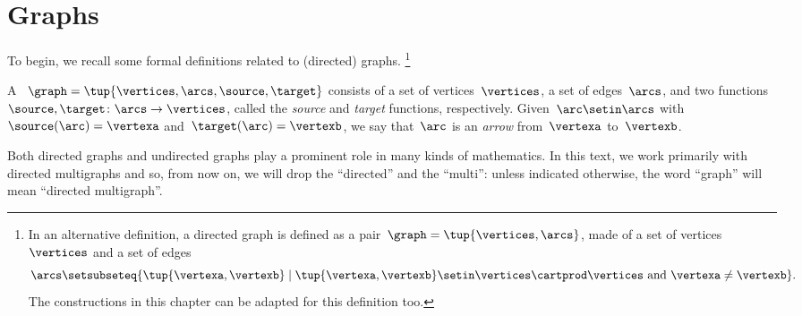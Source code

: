 
\section{Graphs}


To begin, we recall some formal definitions related to (directed) graphs.
\footnote{
    In an alternative definition, a directed graph is defined as a pair~$\graph=\tup{\vertices, \arcs}$, made of a set of vertices~$\vertices$ and a set of edges
    \begin{equation*}
        \arcs \setsubseteq \{ \tup{\vertexa, \vertexb} \mid \tup{\vertexa, \vertexb} \setin \vertices \cartprod \vertices \text{ and } \vertexa \neq \vertexb\}.
    \end{equation*}
    The constructions in this chapter can be adapted for this definition too.
}

\begin{definition}
    \label{def:Graph}
    A \emph{}~$\graph=\tup{\vertices,\arcs, \source,\target}$ consists of a set of vertices~$\vertices$, a set of edges~$\arcs$, and two functions~$\source,\target \colon \arcs \to \vertices$, called the \emph{source} and \emph{target} functions, respectively.
    Given~$\arc\setin \arcs$ with~$\source(\arc)=\vertexa$ and~$\target(\arc)=\vertexb$, we say that~$\arc$ is an \emph{arrow} from~$\vertexa$ to~$\vertexb$.
\end{definition}


\begin{remark}
    Both directed graphs and undirected graphs play a prominent role in many kinds of mathematics.
    In this text, we work primarily with directed multigraphs and so, from now on, we will drop the ``directed'' and the ``multi'': unless indicated otherwise, the word ``graph'' will mean ``directed multigraph''.
\end{remark}

